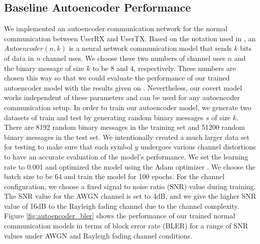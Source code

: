 \subsection{Baseline Autoencoder Performance}
We implemented an autoencoder communication network for the normal communication between UserRX and UserTX. Based on the notation used in \cite{o2017introduction}, an \(Autoencoder (n, k)\) is a neural network communication model that sends \(k\) bits of data in \(n\) channel uses. We choose these two numbers of channel uses \(n\) and the binary message of size \(k\) to be 8 and 4, respectively. These numbers are chosen this way so that we could evaluate the performance of our trained autoencoder model with the results given on \cite{o2017introduction}. Nevertheless, our covert model works independent of these parameters and can be used for any autoencoder communication setup. In order to train our autoencoder model, we generate two datasets of train and test by generating random binary messages \(s\) of size \(k\). There are 8192 random binary messages in the training set and 51200 random binary messages in the test set. We intentionally created a much larger data set for testing to make sure that each symbol \(y\) undergoes various channel distortions to have an accurate evaluation of the model's performance. We set the learning rate to 0.001 and optimized the model using the Adam optimizer \cite{kingma2014adam}. We choose the batch size to be 64 and train the model for 100 epochs. For the channel configuration, we choose a fixed signal to noise ratio (SNR) value during training. The SNR value for the AWGN channel is set to 4dB, and we give the higher SNR value of 16dB to the Rayleigh fading channel due to the channel complexity. Figure \ref{fig:autoencoder_bler} shows the performance of our trained normal communication models in terms of block error rate (BLER) for a range of SNR values under AWGN and Rayleigh fading channel conditions.


